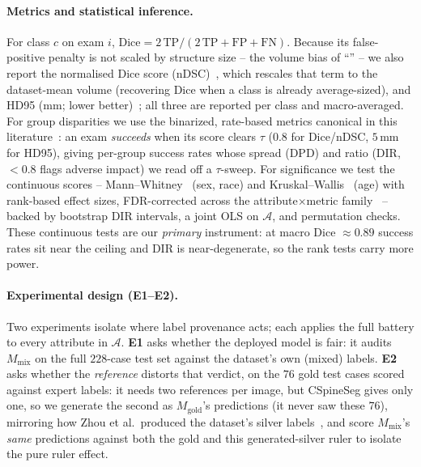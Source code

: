 \paragraph{Metrics and statistical inference.}
\label{sec:metrics}
For class $c$ on exam $i$, $\mathrm{Dice} = 2\,\mathrm{TP} / (2\,\mathrm{TP} +
\mathrm{FP} + \mathrm{FN})$. Because its false-positive penalty is not scaled by
structure size -- the volume bias of ``'' -- we also report the
normalised Dice score (nDSC)~\cite{raina2023ndsc}, which rescales that term to the
dataset-mean volume (recovering Dice when a class is already average-sized), and HD95
(mm; lower better)~\cite{taha2015metrics}; all three are reported per class and
macro-averaged. For group disparities we use the binarized, rate-based metrics canonical
in this literature~\cite{parikh2025labelbias,bird2020fairlearn,eeoc1978uniform}: an exam
\emph{succeeds} when its score clears $\tau$ ($0.8$ for Dice/nDSC, $5$\,mm for HD95),
giving per-group success rates whose spread (DPD) and ratio (DIR, ${<}0.8$ flags adverse
impact) we read off a $\tau$-sweep. For significance we test the continuous scores --
Mann--Whitney~\cite{mann1947test} (sex, race) and Kruskal--Wallis~\cite{kruskal1952ranks}
(age) with rank-based effect sizes, FDR-corrected across the attribute$\times$metric
family~\cite{benjamini1995fdr} -- backed by bootstrap DIR intervals, a joint OLS on
$\mathcal{A}$, and permutation checks. These continuous tests are our \emph{primary}
instrument: at macro Dice ${\approx}0.89$ success rates sit near the ceiling and DIR is
near-degenerate, so the rank tests carry more power.

\paragraph{Experimental design (E1--E2).}
\label{sec:design}
Two experiments isolate where label provenance acts; each applies the full battery to
every attribute in $\mathcal{A}$. \textbf{E1} asks whether the deployed model is fair:
it audits $M_{\mathrm{mix}}$ on the full $228$-case test set against the dataset's own
(mixed) labels. \textbf{E2} asks whether the \emph{reference} distorts that verdict, on
the $76$ gold test cases scored against expert labels: it needs two references per image,
but CSpineSeg gives only one, so we generate the second as $M_{\mathrm{gold}}$'s
predictions (it never saw these $76$), mirroring how Zhou et al.\ produced the dataset's
silver labels~\cite{zhou2025cspineseg}, and score $M_{\mathrm{mix}}$'s \emph{same}
predictions against both the gold and this generated-silver ruler to isolate the pure
ruler effect.
